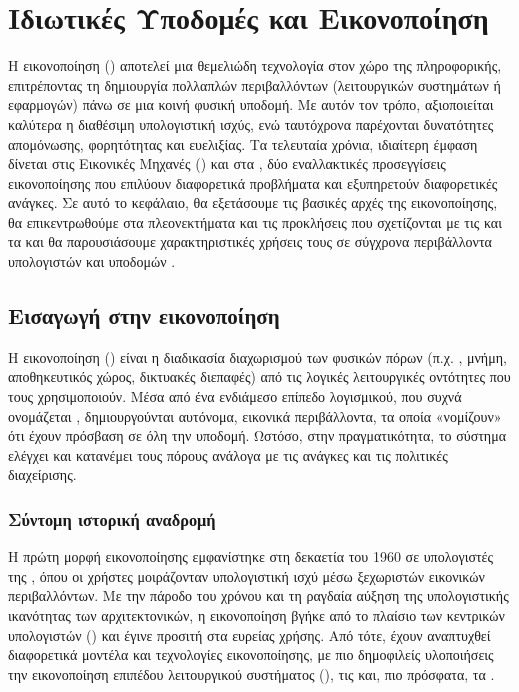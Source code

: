 
\chapter{Ιδιωτικές Υποδομές και Εικονοποίηση}\label{ch:virtualization}

Η εικονοποίηση () αποτελεί μια θεμελιώδη τεχνολογία στον χώρο της πληροφορικής, επιτρέποντας τη δημιουργία πολλαπλών περιβαλλόντων (λειτουργικών συστημάτων ή εφαρμογών) πάνω σε μια κοινή φυσική υποδομή. Με αυτόν τον τρόπο, αξιοποιείται καλύτερα η διαθέσιμη υπολογιστική ισχύς, ενώ ταυτόχρονα παρέχονται δυνατότητες απομόνωσης, φορητότητας και ευελιξίας. Τα τελευταία χρόνια, ιδιαίτερη έμφαση δίνεται στις Εικονικές Μηχανές () και στα , δύο εναλλακτικές προσεγγίσεις εικονοποίησης που επιλύουν διαφορετικά προβλήματα και εξυπηρετούν διαφορετικές ανάγκες. Σε αυτό το κεφάλαιο, θα εξετάσουμε τις βασικές αρχές της εικονοποίησης, θα επικεντρωθούμε στα πλεονεκτήματα και τις προκλήσεις που σχετίζονται με τις  και τα  και θα παρουσιάσουμε χαρακτηριστικές χρήσεις τους σε σύγχρονα περιβάλλοντα υπολογιστών και υποδομών .

\section{Εισαγωγή στην εικονοποίηση}

Η εικονοποίηση () είναι η διαδικασία διαχωρισμού των φυσικών πόρων (π.χ. , μνήμη, αποθηκευτικός χώρος, δικτυακές διεπαφές) από τις λογικές λειτουργικές οντότητες που τους χρησιμοποιούν. Μέσα από ένα ενδιάμεσο επίπεδο λογισμικού, που συχνά ονομάζεται , δημιουργούνται αυτόνομα, εικονικά περιβάλλοντα, τα οποία «νομίζουν» ότι έχουν πρόσβαση σε όλη την υποδομή. Ωστόσο, στην πραγματικότητα, το σύστημα ελέγχει και κατανέμει τους πόρους ανάλογα με τις ανάγκες και τις πολιτικές διαχείρισης.

\subsection{Σύντομη ιστορική αναδρομή}

Η πρώτη μορφή εικονοποίησης εμφανίστηκε στη δεκαετία του 1960 σε υπολογιστές  της , όπου οι χρήστες μοιράζονταν υπολογιστική ισχύ μέσω ξεχωριστών εικονικών περιβαλλόντων. Με την πάροδο του χρόνου και τη ραγδαία αύξηση της υπολογιστικής ικανότητας των  αρχιτεκτονικών, η εικονοποίηση βγήκε από το πλαίσιο των κεντρικών υπολογιστών () και έγινε προσιτή στα  ευρείας χρήσης. Από τότε, έχουν αναπτυχθεί διαφορετικά μοντέλα και τεχνολογίες εικονοποίησης, με πιο δημοφιλείς υλοποιήσεις την εικονοποίηση επιπέδου λειτουργικού συστήματος (), τις  και, πιο πρόσφατα, τα .

